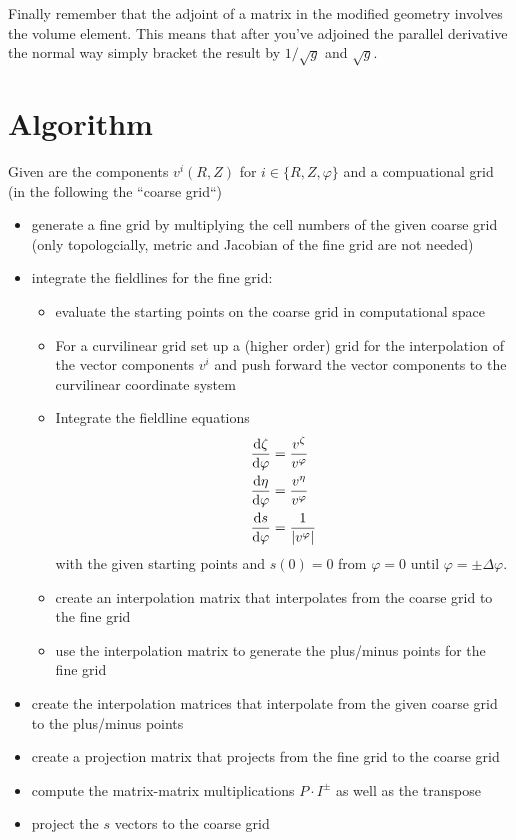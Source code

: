 Finally remember that the adjoint of a matrix in the modified geometry
involves the volume element. This means that after you've adjoined the
parallel derivative the normal way simply bracket the result
by $1/\sqrt{g}$ and $\sqrt{g}$.


\section{Algorithm}
Given are the components $v^i(R,Z)$ for $i\in\{R,Z,\varphi\}$ and a compuational grid (in the following the ``coarse grid``)
\begin{itemize}
  \item generate a fine grid by multiplying the cell numbers of the given coarse grid (only topologcially, metric and Jacobian of the fine grid are not needed)
  \item integrate the fieldlines for the fine grid:
    \begin{itemize}
      \item evaluate the starting points on the coarse grid in computational space 
      \item For a curvilinear grid set up a (higher order) grid for the 
        interpolation of the vector components $v^i$ and push forward the vector components
        to the curvilinear coordinate system
      \item Integrate the fieldline equations 
\begin{subequations}
\begin{align}
\frac{\mathrm{d} \zeta}{\mathrm{d}\varphi} &= \frac{v^\zeta}{v^\varphi}\\
\frac{\mathrm{d} \eta}{\mathrm{d}\varphi} &= \frac{v^\eta}{v^\varphi}\\
\frac{\mathrm{d} s}{\mathrm{d}\varphi} &= \frac{1}{|v^\varphi|}
\end{align}
\label{eq:fieldlines_converted}
\end{subequations}
    with the given starting points and $s(0)=0$ from $\varphi=0$ until $\varphi = \pm\Delta \varphi$.
      \item create an interpolation matrix that interpolates from the coarse grid 
        to the fine grid
      \item use the interpolation matrix to generate the plus/minus points for the fine grid
    \end{itemize}
  \item create the interpolation matrices that interpolate from the given coarse grid 
    to the plus/minus points 
  \item create a projection matrix that projects from the fine grid to the coarse grid
  \item compute the matrix-matrix multiplications $P\cdot I^\pm$ as well as the transpose
  \item project the $s$ vectors to the coarse grid
\end{itemize}

